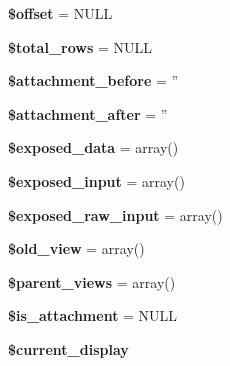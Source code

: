 \begin{DoxyCompactItemize}
\item 
\hypertarget{classview_a30fa86d6c6e4eef3632bd821000e2e33}{
{\bfseries \$offset} = NULL}
\label{classview_a30fa86d6c6e4eef3632bd821000e2e33}

\item 
\hypertarget{classview_ad80b9942b2e00176b93c57526c48888d}{
{\bfseries \$total\_\-rows} = NULL}
\label{classview_ad80b9942b2e00176b93c57526c48888d}

\item 
\hypertarget{classview_ac6aa0ed91545d9b07a07d388dc8fbaa4}{
{\bfseries \$attachment\_\-before} = ''}
\label{classview_ac6aa0ed91545d9b07a07d388dc8fbaa4}

\item 
\hypertarget{classview_a43e9271615c7bca48b8c9abf1cd161d0}{
{\bfseries \$attachment\_\-after} = ''}
\label{classview_a43e9271615c7bca48b8c9abf1cd161d0}

\item 
\hypertarget{classview_a2f755435e8eabb4b0c019f37232a443f}{
{\bfseries \$exposed\_\-data} = array()}
\label{classview_a2f755435e8eabb4b0c019f37232a443f}

\item 
\hypertarget{classview_aa40f1ce888992360d84a44f072eb8ef6}{
{\bfseries \$exposed\_\-input} = array()}
\label{classview_aa40f1ce888992360d84a44f072eb8ef6}

\item 
\hypertarget{classview_adf2d2b67d3f81faa0913c0bfd8acb3a3}{
{\bfseries \$exposed\_\-raw\_\-input} = array()}
\label{classview_adf2d2b67d3f81faa0913c0bfd8acb3a3}

\item 
\hypertarget{classview_a8031538e237d25f6075834eabe94d5a7}{
{\bfseries \$old\_\-view} = array()}
\label{classview_a8031538e237d25f6075834eabe94d5a7}

\item 
\hypertarget{classview_a6965baf375f17f28edbe479f91695110}{
{\bfseries \$parent\_\-views} = array()}
\label{classview_a6965baf375f17f28edbe479f91695110}

\item 
\hypertarget{classview_ad3390a1ab835b72b8b05801d06139e79}{
{\bfseries \$is\_\-attachment} = NULL}
\label{classview_ad3390a1ab835b72b8b05801d06139e79}

\item 
\hypertarget{classview_aabf49e678a01874d9c7f5c337ef54d93}{
{\bfseries \$current\_\-display}}
\label{classview_aabf49e678a01874d9c7f5c337ef54d93}


\end{DoxyCompactItemize}

